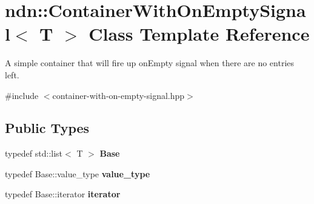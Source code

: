 \hypertarget{classndn_1_1ContainerWithOnEmptySignal}{}\section{ndn\+:\+:Container\+With\+On\+Empty\+Signal$<$ T $>$ Class Template Reference}
\label{classndn_1_1ContainerWithOnEmptySignal}


A simple container that will fire up on\+Empty signal when there are no entries left.  




{\ttfamily \#include $<$container-\/with-\/on-\/empty-\/signal.\+hpp$>$}

\subsection*{Public Types}
\begin{DoxyCompactItemize}
\item 
typedef std\+::list$<$ T $>$ {\bfseries Base}\hypertarget{classndn_1_1ContainerWithOnEmptySignal_a805d6da8f4253f36839bdb596f27b04b}{}\label{classndn_1_1ContainerWithOnEmptySignal_a805d6da8f4253f36839bdb596f27b04b}

\item 
typedef Base\+::value\+\_\+type {\bfseries value\+\_\+type}\hypertarget{classndn_1_1ContainerWithOnEmptySignal_a9e2b7cdcf4aa499be0eab5cd22bfb9bf}{}\label{classndn_1_1ContainerWithOnEmptySignal_a9e2b7cdcf4aa499be0eab5cd22bfb9bf}

\item 
typedef Base\+::iterator {\bfseries iterator}\hypertarget{classndn_1_1ContainerWithOnEmptySignal_aa3156bf879a96921a224c37bbae2cfb9}{}\label{classndn_1_1ContainerWithOnEmptySignal_aa3156bf879a96921a224c37bbae2cfb9}

\end{DoxyCompactItemize}
